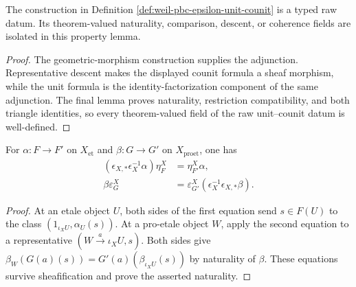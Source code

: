 \begin{lemma}
\label{lemma:weil-sf-well-defined-def-weil-pbc-epsilon-unit-counit}
The construction in Definition \ref{def:weil-pbc-epsilon-unit-counit} is a typed raw datum.  Its theorem-valued naturality, comparison, descent, or coherence fields are isolated in this property lemma.
\end{lemma}
\begin{proof}
The geometric-morphism construction supplies the adjunction.  Representative
descent makes the displayed counit formula a sheaf morphism, while the unit
formula is the identity-factorization component of the same adjunction.  The
final lemma proves naturality, restriction compatibility, and both triangle
identities, so every theorem-valued field of the raw unit--counit datum is
well-defined.
\end{proof}
\begin{lemma}
\label{lemma:weil-pbc-epsilon-unit-counit-naturality}
For $\alpha:F\to F'$ on $X_{\mathrm{et}}$ and $\beta:G\to G'$ on
$X_{\mathrm{proet}}$, one has
\begin{align*}
 (\epsilon_{X,*}\epsilon_X^{-1}\alpha)\eta^X_F
   &=\eta^X_{F'}\alpha,\\
 \beta\varepsilon^X_G
   &=\varepsilon^X_{G'}(\epsilon_X^{-1}\epsilon_{X,*}\beta).
\end{align*}
\end{lemma}
\begin{proof}
At an etale object $U$, both sides of the first equation send $s\in F(U)$
to the class $(1_{\iota_XU},\alpha_U(s))$.  At a pro-etale object $W$, apply
the second equation to a representative $(W\xrightarrow{a}\iota_XU,s)$.
Both sides give
$\beta_W(G(a)(s))=G'(a)(\beta_{\iota_XU}(s))$ by naturality of $\beta$.
These equations survive sheafification and prove the asserted naturality.
\end{proof}

